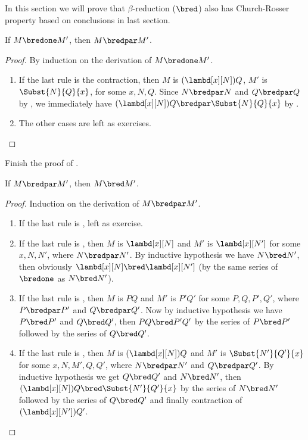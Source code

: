 \documentclass[../../../include/open-logic-section]{subfiles}
\begin{document}


In this section we will prove that $\beta$-reduction ($\bred$) also has
Church-Rosser property based on conclusions in last section.

\begin{lem}
  If $M \bredone M'$, then $M \bredpar M'$.
\end{lem}
\begin{proof} By induction on the derivation of $M \bredone M'$.
  \begin{enumerate}
  \item If the last rule is the contraction, then $M$ is
    $(\lambd[x][N])Q$, $M'$ is $\Subst{N}{Q}{x}$, for some
    $x, N, Q$. Since $N \bredpar N$ and $Q \bredpar Q$ by
    , we immediately have $(\lambd[x][N])Q
    \bredpar \Subst{N}{Q}{x}$ by .
  \item The other cases are left as exercises. 
  \end{enumerate}
\end{proof}

\begin{prob}
  Finish the proof of .
\end{prob}

\begin{lem}
  If $M \bredpar M'$, then $M \bred M'$.
\end{lem}
\begin{proof} Induction on the derivation of $M \bredpar M'$.
  \begin{enumerate}
  \item If the last rule is , left as exercise. 
  \item If the last rule is , then $M$ is 
    $\lambd[x][N]$ and $M'$ is $\lambd[x][N']$ for some $x, N, N'$, where
    $N \bredpar N'$. By inductive hypothesis we have $N \bred N'$, then obviously
    $\lambd[x][N] \bred \lambd[x][N']$ (by the same series of
    $\bredone$ as $N \bred N'$).
  \item If the last rule is , then $M$ is 
    $PQ$ and $M'$ is $P'Q'$ for some $P, Q, P', Q'$, where $P \bredpar P'$
    and $Q \bredpar Q'$. Now by inductive hypothesis we have $P \bred P'$ and $Q \bred
    Q'$, then $PQ \bred P'Q'$ by the series of $P \bred P'$ followed
    by the series of $Q \bred Q'$.
  \item If the last rule is , then $M$ is
    $(\lambd[x][N])Q$ and $M'$ is  $\Subst{N'}{Q'}{x}$ for some
    $x, N, M', Q, Q'$, where $N \bredpar N'$ and $Q \bredpar Q'$. By
    inductive hypothesis we get $Q \bred
    Q'$ and $N \bred N'$, then $(\lambd[x][N])Q \bred
    \Subst{N'}{Q'}{x}$ by the series of $N \bred N'$ followed by the
    series of $Q \bred Q'$ and finally contraction of
    $(\lambd[x][N'])Q'$.
  \end{enumerate}
\end{proof}
\end{document}
